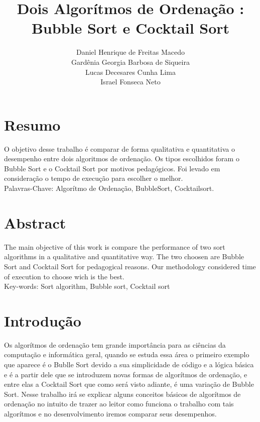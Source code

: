 \documentclass[11pts]{book}
\begin{document}
\title{Dois Algorítmos de Ordenação :\\ Bubble Sort e Cocktail Sort
}

\author{Daniel Henrique de Freitas Macedo\\ Gardênia Georgia Barbosa de Siqueira\\Lucas Decesares Cunha Lima\\Israel Fonseca Neto}

\maketitle

\section{Resumo}

O objetivo desse trabalho é comparar de forma qualitativa e quantitativa o desempenho entre dois algoritmos de ordenação.
Os tipos escolhidos foram o Bubble Sort e o Cocktail Sort por motivos pedagógicos. Foi levado em consideração o tempo de execução para escolher o melhor. \\

Palavras-Chave: Algorítmo de Ordenação, BubbleSort, Cocktailsort. \\

\section{Abstract}

The main objective of this work is compare the performance of two sort algorithms in a qualitative and quantitative way. The two choosen are Bubble Sort and Cocktail Sort for pedagogical reasons. Our methodology considered time of execution to choose wich is the best.\\

Key-words: Sort algorithm, Bubble sort, Cocktail sort\\



\newpage

\section{Introdução}

Os algorítmos de ordenação tem grande importância para as ciências da computação e informática geral, quando se estuda essa área o primeiro exemplo que aparece é o Bublle Sort devido a sua simplicidade de código e a lógica básica e é a partir dele que se introduzem novas formas de algorítmos de ordenação, e entre elas a Cocktail Sort que como será visto adiante, é uma variação de Bubble Sort. Nesse trabalho irá se explicar alguns conceitos básicos de algorítmos de ordenação  no intuito de trazer ao leitor como funciona o trabalho com tais algorítmos e no desenvolvimento iremos comparar seus desempenhos.\\
\end{document}
